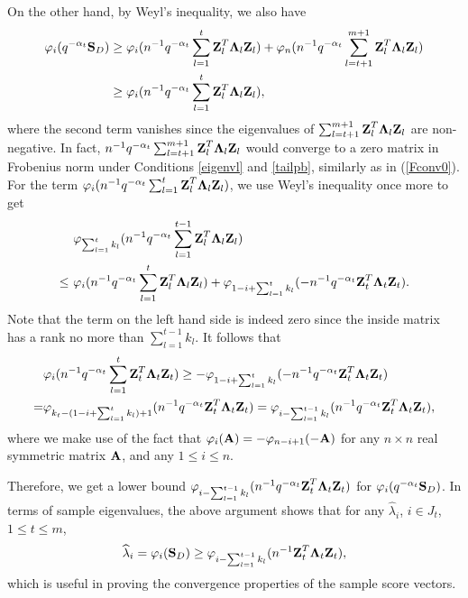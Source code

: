 \documentclass{statsoc}
\newcommand{\bA}{\mbox{\bf A}}
\newcommand{\bS}{\mbox{\bf S}}
\newcommand{\bZ}{\mbox{\bf Z}}
\newcommand{\bLambda}{\mbox{\boldmath $\Lambda$}}
\def\t{^T}
\begin{document}
On the other hand, by Weyl's inequality, we also have
\begin{align*}
\varphi_i(q^{-\alpha_t}\bS_D) &\geq \varphi_i(n^{-1}q^{-\alpha_t} \sum_{l = 1}^t \bZ_l\t \bLambda_l \bZ_l) + \varphi_n(n^{-1}q^{-\alpha_t} \sum_{l = t + 1}^{m + 1} \bZ_l\t \bLambda_l \bZ_l)\\
& \geq \varphi_i(n^{-1}q^{-\alpha_t} \sum_{l = 1}^t \bZ_l\t \bLambda_l \bZ_l),
\end{align*}
where the second term vanishes since the eigenvalues of $\sum_{l = t + 1}^{m + 1} \bZ_l\t \bLambda_l \bZ_l$ are non-negative. In fact, $n^{-1}q^{-\alpha_t} \sum_{l = t + 1}^{m + 1} \bZ_l\t \bLambda_l \bZ_l$ would converge to a zero matrix in Frobenius norm under Conditions \ref{eigenvl} and \ref{tailpb}, similarly as in (\ref{Fconv0}). For the term $\varphi_i(n^{-1}q^{-\alpha_t} \sum_{l = 1}^t \bZ_l\t \bLambda_l \bZ_l)$, we use Weyl's inequality once more to get
\begin{align*}
&\varphi_{\sum_{l = 1}^t k_l}(n^{-1}q^{-\alpha_t} \sum_{l = 1}^{t - 1} \bZ_l\t \bLambda_l \bZ_l) \\
\leq \ &\varphi_i(n^{-1}q^{-\alpha_t} \sum_{l = 1}^t \bZ_l\t \bLambda_l \bZ_l) + \varphi_{1 - i + \sum_{l = 1}^t k_l}(-n^{-1}q^{-\alpha_t} \bZ_t\t \bLambda_t \bZ_t).
\end{align*}
Note that the term on the left hand side is indeed zero since the inside matrix has a rank no more than $\sum_{l = 1}^{t - 1} k_l$. It follows that
\begin{align*}
&\varphi_i  (n^{-1}q^{-\alpha_t} \sum_{l = 1}^t \bZ_t\t \bLambda_t \bZ_t)\geq -\varphi_{1 - i + \sum_{l = 1}^t k_l}(-n^{-1}q^{-\alpha_t} \bZ_t\t \bLambda_t \bZ_t) \\
= &\varphi_{k_t - (1 - i + \sum_{l = 1}^t k_l) + 1}(n^{-1}q^{-\alpha_t} \bZ_t\t \bLambda_t \bZ_t) = \varphi_{i - \sum_{l = 1}^{t - 1} k_l}(n^{-1}q^{-\alpha_t} \bZ_t\t \bLambda_t \bZ_t),
\end{align*}
where we make use of the fact that $\varphi_i(\bA) = - \varphi_{n - i + 1}(-\bA)$ for any $n \times n$ real symmetric matrix $\bA$, and any $1 \leq i \leq n$.

Therefore, we get a lower bound $\varphi_{i - \sum_{l = 1}^{t - 1} k_l}(n^{-1} q^{-\alpha_t} \bZ_t\t \bLambda_t \bZ_t)$ for $\varphi_i(q^{-\alpha_t} \bS_D)$. In terms of sample eigenvalues, the above argument shows that for any $\widehat{\lambda}_i$, $i \in J_t$, $1 \leq t \leq m$,
\begin{equation} \label{eig}
\widehat{\lambda}_i = \varphi_i(\bS_D) \geq \varphi_{i - \sum_{l = 1}^{t - 1} k_l}(n^{-1} \bZ_t\t \bLambda_t \bZ_t),
\end{equation}
which is useful in proving the convergence properties of the sample score vectors.
\end{document}
